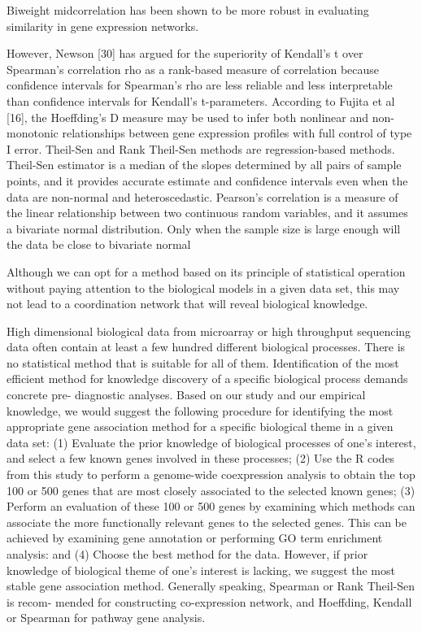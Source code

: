 Biweight midcorrelation has been shown to be more robust in evaluating similarity in gene expression networks.


However, Newson [30] has argued for the superiority of Kendall’s t over Spearman’s correlation rho as a rank-based measure of correlation because confidence intervals for Spearman’s rho are less reliable and less interpretable than confidence intervals for Kendall’s t-parameters. According to Fujita et al [16], the Hoeffding’s D measure may be used to infer both nonlinear and non-monotonic relationships between gene expression profiles with full control of type I error. Theil-Sen and Rank Theil-Sen methods are regression-based methods. Theil-Sen estimator is a median of the slopes determined by all pairs of sample points, and it provides accurate estimate and confidence intervals even when the data are non-normal and heteroscedastic. Pearson’s correlation is a measure of the linear relationship between two continuous random variables, and it assumes a bivariate normal distribution. Only when the sample size is large enough will the data be close to bivariate normal

Although we can opt for a method based on its principle of statistical operation without paying attention to the biological models in a given data set, this may not lead to a coordination network that will reveal biological knowledge. 

High dimensional biological data from microarray or high throughput sequencing data often contain at least a few hundred different biological processes. There is no statistical method that is suitable for all of them. Identification of the most efficient method for knowledge discovery of a specific biological process demands concrete pre- diagnostic analyses. Based on our study and our empirical knowledge, we would suggest the following procedure for identifying the most appropriate gene association method for a specific biological theme in a given data set: (1) Evaluate the prior knowledge of biological processes of one’s interest, and select a few known genes involved in these processes; (2) Use the R codes from this study to perform a genome-wide coexpression analysis to obtain the top 100 or 500 genes that are most closely associated to the selected known genes; (3) Perform an evaluation of these 100 or 500 genes by examining which methods can associate the more functionally relevant genes to the selected genes. This can be achieved by examining gene annotation or performing GO term enrichment analysis: and (4) Choose the best method for the data. However, if prior knowledge of biological theme of one’s interest is lacking, we suggest the most stable gene association method. Generally speaking, Spearman or Rank Theil-Sen is recom- mended for constructing co-expression network, and Hoeffding, Kendall or Spearman for pathway gene analysis.



